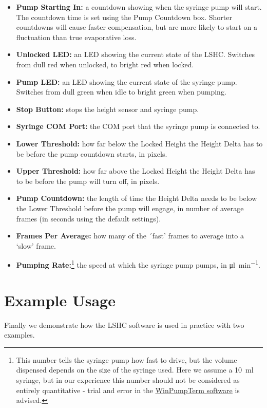 \documentclass[11pt,a4paper,twoside]{article}
\begin{document}
\begin{itemize}
\item \textbf{Pump Starting In:} a countdown showing when the syringe pump will start. The countdown time is set using the Pump Countdown box. Shorter countdowns will cause faster compensation, but are more likely to start on a fluctuation than true evaporative loss.
\item \textbf{Unlocked LED:} an LED showing the current state of the LSHC. Switches from dull red when unlocked, to bright red when locked.
\item \textbf{Pump LED:} an LED showing the current state of the syringe pump. Switches from dull green when idle to bright green when pumping. 
\item \textbf{Stop Button:} stops the height sensor and syringe pump. 
\item \textbf{Syringe COM Port:} the COM port that the syringe pump is connected to. 
\item \textbf{Lower Threshold:} how far below the Locked Height the Height Delta has to be before the pump countdown starts, in pixels. 
\item \textbf{Upper Threshold:} how far above the Locked Height the Height Delta has to be before the pump will turn off, in pixels. 
\item \textbf{Pump Countdown:} the length of time the Height Delta needs to be below the Lower Threshold before the pump will engage, in number of average frames (in seconds using the default settings).
\item \textbf{Frames Per Average:} how many of the ´fast' frames to average into a `slow' frame. 
\item \textbf{Pumping Rate:}\footnote{This number tells the syringe pump how fast to drive, but the volume dispensed depends on the size of the syringe used. Here we assume a \SI{10}{\milli\litre} syringe, but in our experience this number should not be considered as entirely quantitative - trial and error in the \href{http://www.syringepump.com/software.php}{\underline{WinPumpTerm software}} is advised.} the speed at which the syringe pump pumps, in \si{\micro\litre\per\minute}.
\end{itemize} 

\section{Example Usage}
Finally we demonstrate how the LSHC software is used in practice with two examples. 
\end{document}
